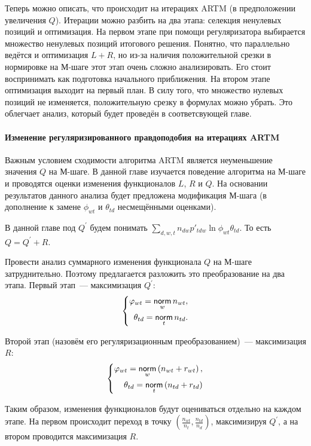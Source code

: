 \documentclass[12pt, twoside]{article}
\begin{document}
Теперь можно описать, что происходит на итерациях ARTM (в предположении увеличения $Q$). Итерации можно разбить на два этапа: селекция ненулевых позиций и оптимизация. На первом этапе при помощи регуляризатора выбирается множество ненулевых позиций итогового решения. Понятно, что параллельно ведётся и оптимизация $L + R$, но из-за наличия положительной срезки в нормировке на М-шаге этот этап очень сложно анализировать. Его стоит воспринимать как подготовка начального приближения. На втором этапе оптимизация выходит на первый план. В силу того, что множество нулевых позиций не изменяется, положительную срезку в формулах можно убрать. Это облегчает анализ, который будет проведён в соответсвующей главе.

	\paragraph{Изменение регуляризированного правдоподобия на итерациях ARTM}
Важным условием сходимости алгоритма ARTM является неуменьшение значения $Q$ на М-шаге. В данной главе изучается поведение алгоритма на М-шаге и проводятся оценки изменения функционалов $L$, $R$ и $Q$. На основании результатов данного анализа будет предложена  модификация М-шага (в дополнение к замене $\phi_{wt}$ и $\theta_{td}$ несмещёнными оценками).

В данной главе под $Q^{\prime}$ будем понимать $\sum\limits_{d, w, t} n_{dw} p'_{tdw} \ln{\phi_{wt}\theta_{td}}$. То есть $Q = Q^{\prime} +  R$.

Провести анализ суммарного изменения функционала $Q$ на М-шаге затруднительно. Поэтому предлагается разложить это преобразование на два этапа. Первый этап~--- максимизация $Q^{\prime}$:
\[
\left\{
	\begin{aligned}
		\varphi_{wt} = \mathop{\mathsf{norm}}\limits_w  n_{wt},\\
		\theta_{td} = \mathop{\mathsf{norm}}\limits_t n_{td} .
	\end{aligned}
\right.
\]

Второй этап (назовём его регуляризационным преобразованием)~--- максимизация $R$:
\[
\left\{
\begin{aligned}
 \varphi_{wt}  = \mathop{\mathsf{norm}}\limits_w \left(n_{wt} + r_{wt} \right),\\
\theta_{td} = \mathop{\mathsf{norm}}\limits_t  \left(n_{td} + r_{td}\right)
\end{aligned}
\right.
\]

Таким образом, изменения функционалов будут оцениваться  отдельно на каждом этапе. На первом происходит переход в точку $\left(\frac{n_{wt}}{n_t}, \frac{n_{td}}{n_d}\right)$, максимизируя $Q^{\prime}$, а на втором проводится максимизация $R$. 
\end{document}
